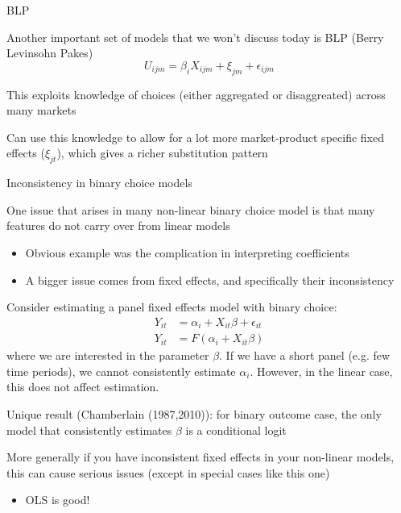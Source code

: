 \documentclass[notes,11pt, aspectratio=169]{beamer}
\newenvironment{wideitemize}{\itemize\addtolength{\itemsep}{10pt}}{\enditemize}
\begin{document}
\begin{frame}{BLP}
  \begin{wideitemize}
  \item Another important set of models that we won't discuss today is
    BLP (Berry Levinsohn Pakes)
    $$ U_{ijm} = \beta_{i}X_{ijm} + \xi_{jm} + \epsilon_{ijm}$$
  \item This exploits knowledge of choices (either aggregated or
    disaggreated) across many markets
  \item Can use this knowledge to allow for a lot more market-product
    specific fixed effects ($\xi_{jt}$), which gives a richer
    substitution pattern
  \end{wideitemize}
\end{frame}

\begin{frame}{Inconsistency in binary choice models}
  \begin{wideitemize}
  \item One issue that arises in many non-linear binary choice model is that many
    features do not carry over from linear models
    \begin{itemize}
    \item Obvious example was the complication in interpreting coefficients
    \item A bigger issue comes from fixed effects, and specifically their inconsistency      
    \end{itemize}
\vspace{-5pt}    
  \item Consider estimating a panel fixed effects model with binary choice:
    \begin{align*}
      Y_{it} &= \alpha_{i} + X_{it}\beta + \epsilon_{it}\\
      Y_{it} &= F(\alpha_{i} + X_{it}\beta)
    \end{align*}
    where we are interested in the parameter $\beta$. If we have a
    short panel (e.g. few time periods), we cannot consistently
    estimate $\alpha_{i}$. However, in the linear case, this does not
    affect estimation.
  \item Unique result (Chamberlain (1987,2010)): for binary
    outcome case, the only model that
    consistently estimates $\beta$ is a conditional logit
  \item More generally if you have inconsistent fixed effects in your
    non-linear models, this can cause serious issues (except in
    special cases like this one)
    \begin{itemize}
    \item OLS is good!
    \end{itemize}
  \end{wideitemize}
\end{frame}
\end{document}

